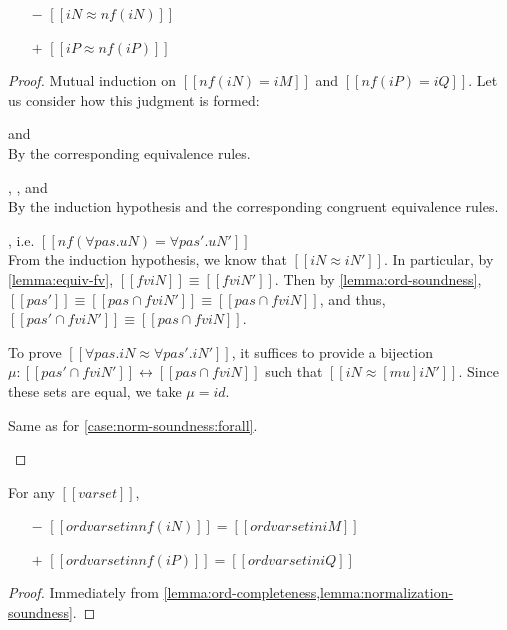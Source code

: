 \begin{lemma}
  \label{lemma:normalization-soundness}
  \hfill
  \begin{itemize}
    \item[$-$] $[[iN ≈ nf(iN)]]$
    \item[$+$] $[[iP ≈ nf(iP)]]$
  \end{itemize}
\end{lemma}
\begin{proof}
  Mutual induction on $[[nf(iN) = iM]]$ and $[[nf(iP) = iQ]]$.
  Let us consider how this judgment is formed:
  \begin{caseof}
    \item{\nameref{\ottdruleNrmNVarLabel} and \nameref{\ottdruleNrmPVarLabel}}\\ By
      the corresponding equivalence rules.
    \item{\nameref{\ottdruleNrmShiftULabel}, \nameref{\ottdruleNrmShiftDLabel},
        and \nameref{\ottdruleNrmArrowLabel}}\\
      By the induction hypothesis and the corresponding congruent equivalence rules.
    \item{\nameref{\ottdruleNrmForallLabel}}, i.e. $[[nf(∀pas.uN) = ∀pas'.uN']]$ \label{case:norm-soundness:forall}\\
      From the induction hypothesis, we
      know that $[[iN ≈ iN']]$. In particular, by \cref{lemma:equiv-fv}, $[[fv
        iN]] \equiv [[fv iN']]$.
      Then by \cref{lemma:ord-soundness}, $[[{pas'}]]
      \equiv [[{pas} ∩ fv iN']] \equiv [[{pas} ∩ fv iN]]$, and thus,
      $[[{pas'} ∩ fv iN']] \equiv [[{pas} ∩ fv iN]]$.
      
      To prove $[[∀pas.iN ≈ ∀pas'.iN']]$, it suffices to provide a bijection 
      $\mu : [[{pas'} ∩ fv iN']] \leftrightarrow [[{pas} ∩ fv iN]]$ such that
      $[[iN ≈ [mu]iN']]$. Since these sets are equal, we take $\mu = id$.
    \item{\nameref{\ottdruleNrmExistsLabel}} Same as for \cref{case:norm-soundness:forall}.
  \end{caseof}
\end{proof}

\begin{corollary}
  \label{corollary:normalization-ord}
  For any $[[varset]]$,
  \begin{itemize}
  \item[$-$] $[[ord varset in nf(iN)]] = [[ord varset in iM]]$
  \item[$+$] $[[ord varset in nf(iP)]] = [[ord varset in iQ]]$
  \end{itemize}
\end{corollary}
\begin{proof}
  Immediately from \cref{lemma:ord-completeness,lemma:normalization-soundness}.
\end{proof}

